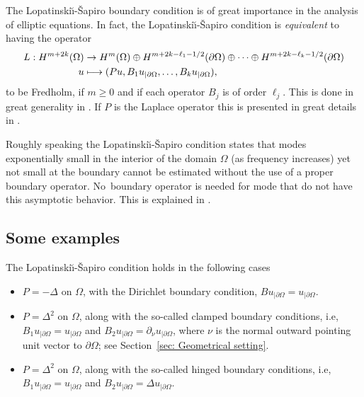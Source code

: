 \documentclass[10pt]{amsart}
\newcommand\mto{\mathchoice{\longmapsto}{\mapsto}{\mapsto}{\mapsto}}
\theoremstyle{plain}
\theoremstyle{definition}
\newcommand{\LS}{Lopatinski\u{\i}-\v{S}apiro\xspace}
\begin{document}
The \LS boundary condition is of great importance in the analysis of
elliptic equations. In fact, the \LS condition is
\emph{equivalent} to having the operator
\begin{align*}
L: H^{m+2k}(\Omega) &\to H^{m}(\Omega)
\oplus H^{m+2k-\ell_1-1/2}(\partial \Omega)
\oplus \cdots \oplus
H^{m+2k-\ell_k-1/2}(\partial \Omega) \\
u & \mto (P u, B_1 u_{|\partial \Omega}, \dots, B_k u_{|\partial \Omega}),\notag
\end{align*}
to be Fredholm, if $m\geq 0$ and if each operator $B_j$ is of order
$\ell_j$. This is done in great generality in \cite[Chap.\,20]{Hoermander:V3}. If $P$ is the Laplace operator this is presented
in great details in \cite[Chap.\,3]{JGL-vol2}.

Roughly speaking the \LS condition states that modes exponentially
small in the interior of the domain $\Omega$ (as frequency increases)
yet not small at the boundary cannot be estimated without the use of a proper
boundary operator.
No~boundary operator is needed for mode that do not have this asymptotic behavior.
This is explained in \cite[\S 2.1.1]{JGL-vol2}.

\subsection{Some examples}

The \LS condition holds in the following cases
\begin{itemize}
\item $P=-\Delta$ on $\Omega$, with the Dirichlet boundary condition, $Bu_{|\partial\Omega}=u_{|\partial\Omega}$.
\item $P=\Delta^2$ on $\Omega$, along with the so-called clamped
boundary conditions, i.e,
$B_1u_{|\partial\Omega}=u_{|\partial\Omega}$ and
$B_2u_{|\partial\Omega}=\partial_{\nu}u_{|\partial\Omega}$, where
$\nu$ is the normal outward pointing unit vector to
$\partial\Omega$; see Section~\ref{sec: Geometrical setting}.
\item $P=\Delta^2$ on $\Omega$, along with the so-called hinged boundary conditions, i.e, $B_1u_{|\partial\Omega}=u_{|\partial\Omega}$ and $B_2u_{|\partial\Omega}=\Delta u_{|\partial\Omega}$.
\end{itemize}
\end{document}
